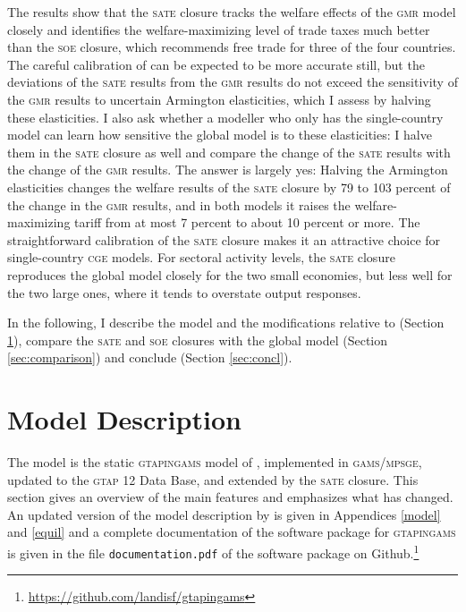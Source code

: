 \documentclass{jgea}
\newcommand{\CGE}{\textsc{cge}\xspace}
\newcommand{\SOE}{\textsc{soe}\xspace}
\newcommand{\SATE}{\textsc{sate}\xspace}
\newcommand{\GMR}{\textsc{gmr}\xspace}
\newcommand{\GAMS}{\textsc{gams}\xspace}
\newcommand{\MPSGE}{\textsc{mpsge}\xspace}
\newcommand{\GTAP}{\textsc{gtap}\xspace}
\newcommand{\GTAPINGAMS}{\textsc{gtapingams}\xspace}
\newcommand{\DOCU}{\texttt{documentation.pdf}\xspace}
\newcommand{\GIGURL}{\url{https://github.com/landisf/gtapingams}}
\begin{document}
The results show that the \SATE closure tracks the welfare effects of the \GMR model closely and identifies the welfare-maximizing level of trade taxes much better than the \SOE closure, which recommends free trade for three of the four countries.
The careful calibration of \citet{Schreiber2024} can be expected to be more accurate still, but the deviations of the \SATE results from the \GMR results do not exceed the sensitivity of the \GMR results to uncertain Armington elasticities, which I assess by halving these elasticities.
I also ask whether a modeller who only has the single-country model can learn how sensitive the global model is to these elasticities: I halve them in the \SATE closure as well and compare the change of the \SATE results with the change of the \GMR results.
The answer is largely yes: Halving the Armington elasticities changes the welfare results of the \SATE closure by 79 to 103 percent of the change in the \GMR results, and in both models it raises the welfare-maximizing tariff from at most 7 percent to about 10 percent or more.
The straightforward calibration of the \SATE closure makes it an attractive choice for single-country \CGE models.
For sectoral activity levels, the \SATE closure reproduces the global model closely for the two small economies, but less well for the two large ones, where it tends to overstate output responses.

In the following, I describe the model and the modifications relative to \citet{LanzRutherford2016} (Section \ref{sec:model}), compare the \SATE and \SOE closures with the global model (Section \ref{sec:comparison}) and conclude (Section \ref{sec:concl}).

\section{Model Description}\label{sec:model}

The model is the static \GTAPINGAMS model of \citet{LanzRutherford2016}, implemented in \GAMS/\MPSGE, updated to the \GTAP 12 Data Base, and extended by the \SATE closure.
This section gives an overview of the main features and emphasizes what has changed.
An updated version of the model description by \citet{LanzRutherford2016} is given in Appendices \ref{model} and \ref{equil} and a complete documentation of the software package for \GTAPINGAMS is given in the file \DOCU of the software package on Github.\footnote{%
  \GIGURL
}
\end{document}
